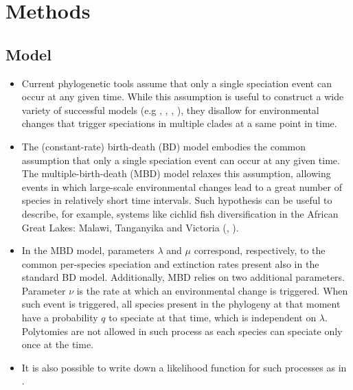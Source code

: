 \documentclass{article}
\begin{document}
\section{Methods}

\subsection{Model}
\begin{itemize}

\item Current phylogenetic tools assume that only a single speciation event 
can occur at any given time.
While this assumption is useful to construct a wide variety of successful 
models (e.g \cite{Maddison2007biSSE}, \cite{Valente2015}, 
\cite{etienne2012diversity}, \cite{etienne2014estimating}),
they disallow for environmental changes that trigger speciations 
in multiple clades at a same point in time. 

\item The (constant-rate) birth-death (BD) model 
embodies the common assumption that 
only a single speciation event can occur at any given time.
The multiple-birth-death (MBD) model relaxes this assumption, 
allowing events in which 
large-scale environmental changes lead to a great number of species 
in relatively short time intervals. 
Such hypothesis can be useful to describe, for example, 
systems like cichlid fish diversification in the 
African Great Lakes: Malawi, Tanganyika and Victoria 
(\cite{janzen2016}, \cite{janzen2017}).

\item In the MBD model, parameters $\lambda$ and $\mu$ correspond, respectively, 
to the common per-species speciation and extinction rates present 
also in the standard BD model. 
Additionally, MBD relies on two additional parameters. 
Parameter $\nu$ is the rate at which an environmental change is triggered.
When such event is triggered, 
all species present in the phylogeny at that moment
have a probability $q$ to speciate at that time, which is 
independent on $\lambda$. 
Polytomies are not allowed in such process 
as each species can speciate only once at the time.

\item It is also possible to write down a likelihood function 
for such processes as in \cite{mbd}.
    
\end{itemize}
\end{document}
